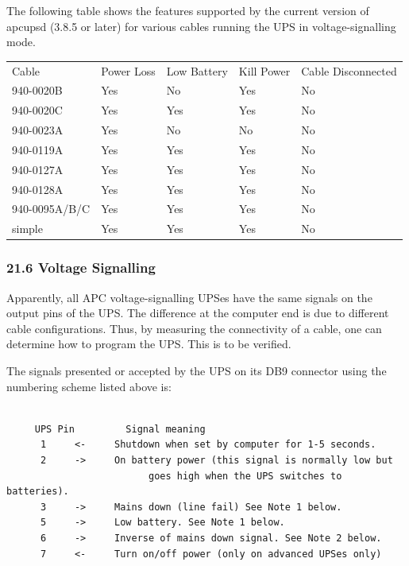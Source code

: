 {{{{{{{{{{The following table shows the features supported by the current version of
apcupsd (3.8.5 or later) for various cables running the UPS in
voltage-signalling mode.  

\begin{longtable}{p{1.2in}p{0.8in}p{1.2in}p{0.8in}p{1.0in}}
{Cable} & {Power Loss} & {Low Battery} & {Kill Power} & {Cable Disconnected 
 } \\
{940-0020B} & {Yes} & {No} & {Yes} & {No 
 } \\
{940-0020C} & {Yes} & {Yes} & {Yes} & {No 
 } \\
{940-0023A} & {Yes} & {No} & {No} & {No 
 } \\
{940-0119A} & {Yes} & {Yes} & {Yes} & {No 
 } \\
{940-0127A} & {Yes} & {Yes} & {Yes} & {No 
 } \\
{940-0128A} & {Yes} & {Yes} & {Yes} & {No 
 } \\
{940-0095A/B/C} & {Yes} & {Yes} & {Yes} & {No 
 } \\
{simple} & {Yes} & {Yes} & {Yes} & {No  
}

\end{longtable}

\label{Voltage-Signalling}

\subsubsection*{21.6 Voltage Signalling}

\label{index-Voltage-Signalling_002c-Cables-198}
\label{index-Cables_002c-Voltage-Signalling-199}
Apparently, all APC voltage-signalling UPSes have the same signals on the
output pins of the UPS. The difference at the computer end is due to different
cable configurations. Thus, by measuring the connectivity of a cable, one can
determine how to program the UPS. This is to be verified.  

The signals presented or accepted by the UPS on its DB9 connector using the
numbering scheme listed above is: 

\footnotesize
\begin{verbatim}
     
     UPS Pin         Signal meaning
      1     <-     Shutdown when set by computer for 1-5 seconds.
      2     ->     On battery power (this signal is normally low but
                         goes high when the UPS switches to batteries).
      3     ->     Mains down (line fail) See Note 1 below.
      5     ->     Low battery. See Note 1 below.
      6     ->     Inverse of mains down signal. See Note 2 below.
      7     <-     Turn on/off power (only on advanced UPSes only)
     

\end{verbatim}}}}}}}}}}}
